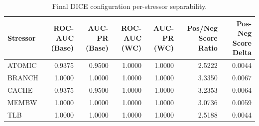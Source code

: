 \begin{table}[t]
\centering
\caption{Final DICE configuration per-stressor separability.}
\label{tab:dice_full_stressor}
\footnotesize
\begin{tabular}{lrrrrrr}
\toprule
Stressor & ROC-AUC (Base) & AUC-PR (Base) & ROC-AUC (WC) & AUC-PR (WC) & Pos/Neg Score Ratio & Pos-Neg Score Delta \\
\midrule
ATOMIC & 0.9375 & 0.9500 & 1.0000 & 1.0000 & 2.5222 & 0.0044 \\
BRANCH & 1.0000 & 1.0000 & 1.0000 & 1.0000 & 3.3350 & 0.0067 \\
CACHE & 0.9375 & 0.9500 & 1.0000 & 1.0000 & 3.2353 & 0.0064 \\
MEMBW & 1.0000 & 1.0000 & 1.0000 & 1.0000 & 3.0736 & 0.0059 \\
TLB & 1.0000 & 1.0000 & 1.0000 & 1.0000 & 2.5188 & 0.0044 \\
\bottomrule
\end{tabular}

\end{table}
